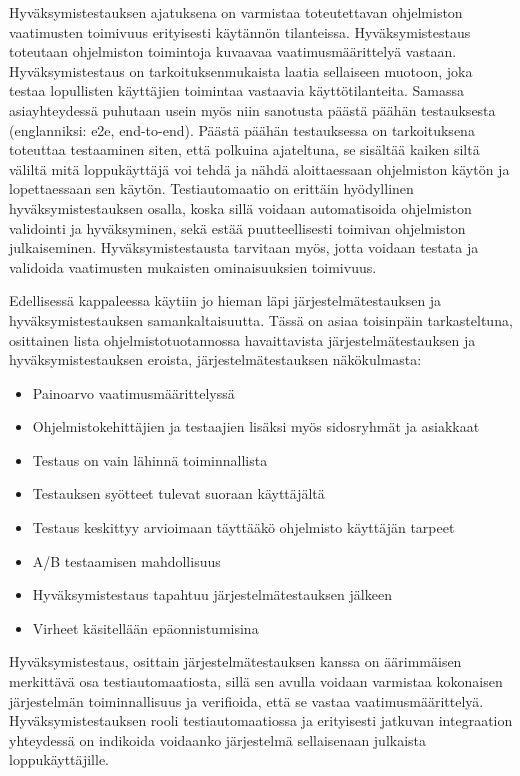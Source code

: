     Hyväksymistestauksen ajatuksena on varmistaa toteutettavan ohjelmiston vaatimusten toimivuus erityisesti käytännön tilanteissa.
    Hyväksymistestaus toteutaan ohjelmiston toimintoja kuvaavaa vaatimusmäärittelyä vastaan.
    Hyväksymistestaus on tarkoituksenmukaista laatia sellaiseen muotoon, joka testaa lopullisten käyttäjien toimintaa vastaavia käyttötilanteita.
    Samassa asiayhteydessä puhutaan usein myös niin sanotusta päästä päähän testauksesta (englanniksi: e2e, end-to-end).
    Päästä päähän testauksessa on tarkoituksena toteuttaa testaaminen siten, että polkuina ajateltuna, se sisältää kaiken siltä väliltä mitä loppukäyttäjä voi tehdä ja nähdä aloittaessaan ohjelmiston käytön ja lopettaessaan sen käytön.
    Testiautomaatio on erittäin hyödyllinen hyväksymistestauksen osalla, koska sillä voidaan automatisoida ohjelmiston validointi ja hyväksyminen, sekä estää puutteellisesti toimivan ohjelmiston julkaiseminen.
    Hyväksymistestausta tarvitaan myös, jotta voidaan testata ja validoida vaatimusten mukaisten ominaisuuksien toimivuus.

    Edellisessä kappaleessa käytiin jo hieman läpi järjestelmätestauksen ja hyväksymistestauksen samankaltaisuutta.
    Tässä on asiaa toisinpäin tarkasteltuna, osittainen lista ohjelmistotuotannossa havaittavista järjestelmätestauksen ja hyväksymistestauksen eroista, järjestelmätestauksen näkökulmasta:

    \begin{itemize}
      \item Painoarvo vaatimusmäärittelyssä
      \item Ohjelmistokehittäjien ja testaajien lisäksi myös sidosryhmät ja asiakkaat
      \item Testaus on vain lähinnä toiminnallista
      \item Testauksen syötteet tulevat suoraan käyttäjältä
      \item Testaus keskittyy arvioimaan täyttääkö ohjelmisto käyttäjän tarpeet
      \item A/B testaamisen mahdollisuus
      \item Hyväksymistestaus tapahtuu järjestelmätestauksen jälkeen
      \item Virheet käsitellään epäonnistumisina
    \end{itemize}

    Hyväksymistestaus, osittain järjestelmätestauksen kanssa on äärimmäisen merkittävä osa testiautomaatiosta, sillä sen avulla voidaan varmistaa kokonaisen järjestelmän toiminnallisuus ja verifioida, että se vastaa vaatimusmäärittelyä.
    Hyväksymistestauksen rooli testiautomaatiossa ja erityisesti jatkuvan integraation yhteydessä on indikoida voidaanko järjestelmä sellaisenaan julkaista loppukäyttäjille.

